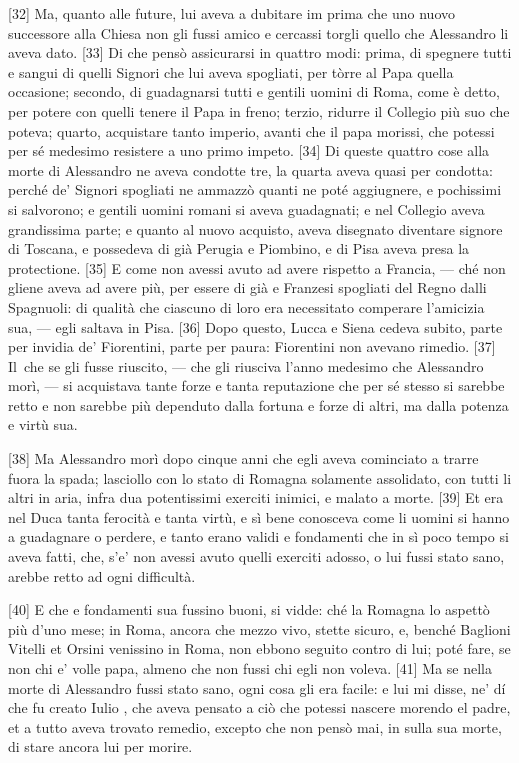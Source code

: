\pagebreak

{[}32{]} Ma, quanto alle future, lui aveva a dubitare im prima che uno
nuovo successore alla Chiesa non gli fussi amico e cercassi torgli
quello che Alessandro li aveva dato. {[}33{]} Di che pensò assicurarsi
in quattro modi: prima, di spegnere tutti e sangui di quelli Signori che
lui aveva spogliati, per tòrre al Papa quella occasione; secondo, di
guadagnarsi tutti e gentili uomini di Roma, come è detto, per potere con
quelli tenere il Papa in freno; terzio, ridurre il Collegio più suo che
poteva; quarto, acquistare tanto imperio, avanti che il papa morissi,
che potessi per sé medesimo resistere a uno primo impeto. {[}34{]} Di
queste quattro cose alla morte di Alessandro ne aveva condotte tre, la
quarta aveva quasi per condotta: perché de' Signori spogliati ne ammazzò
quanti ne poté aggiugnere, e pochissimi si salvorono; e gentili uomini
romani si aveva guadagnati; e nel Collegio aveva grandissima parte; e
quanto al nuovo acquisto, aveva disegnato diventare signore di Toscana,
e possedeva di già Perugia e Piombino, e di Pisa aveva presa la
protectione. {[}35{]} E come non avessi avuto ad avere rispetto a
Francia, --- ché non gliene aveva ad avere più, per essere di già e
Franzesi spogliati del Regno dalli Spagnuoli: di qualità che ciascuno di
loro era necessitato comperare l'amicizia sua, --- egli saltava in Pisa.
{[}36{]} Dopo questo, Lucca e Siena cedeva subito, parte per invidia de'
Fiorentini, parte per paura: Fiorentini non avevano rimedio. {[}37{]} Il\est\
che se gli fusse riuscito, --- che gli riusciva l'anno medesimo che
Alessandro morì, --- si acquistava tante forze e tanta reputazione che per sé stesso 
si sarebbe retto e non sarebbe più dependuto dalla fortuna
e forze di altri, ma dalla potenza e virtù sua.

{[}38{]} Ma Alessandro morì dopo cinque anni che egli aveva cominciato a
trarre fuora la spada; lasciollo con lo stato di Romagna solamente
assolidato, con tutti li altri in aria, infra dua potentissimi exerciti
inimici, e malato a morte. {[}39{]} Et era nel Duca tanta ferocità e
tanta virtù, e sì bene conosceva come li uomini si hanno a guadagnare o
perdere, e tanto erano validi e fondamenti che in sì poco tempo si aveva
fatti, che, s'e' non avessi avuto quelli exerciti adosso, o lui fussi
stato sano, arebbe retto ad ogni difficultà.

{[}40{]} E che e fondamenti sua fussino buoni, si vidde: ché la Romagna
lo aspettò più d'uno mese; in Roma, ancora che mezzo vivo, stette
sicuro, e, benché Baglioni Vitelli et Orsini venissino in Roma, non
ebbono seguito contro di lui; poté fare, se non chi e' volle papa,
almeno che non fussi chi egli non voleva. {[}41{]} Ma se nella morte di
Alessandro fussi stato sano, ogni cosa gli era facile: e lui mi disse,
ne' dí che fu creato Iulio \versal{II}, che aveva pensato a ciò che potessi
nascere morendo el padre, et a tutto aveva trovato remedio, excepto che
non pensò mai, in sulla sua morte, di stare ancora lui per morire.

